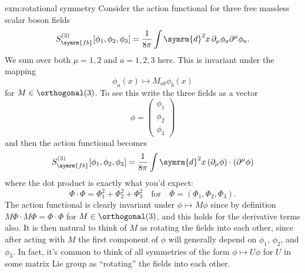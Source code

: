 \documentclass[fleqn]{NotesClass}
\renewcommand{\dl}[1]{\symrm{d}#1}
\newcommand{\freeboson}{\symrm{fb}}
\begin{document}
    \begin{exm}{}{exm:rotational symmetry}
        Consider the action functional for three free massless scalar boson fields
        \begin{equation}
            S_{\freeboson}^{(3)}[\phi_1, \phi_2, \phi_3] = \frac{1}{8\pi} \int \dl{^2x} \, \partial_\mu \phi_a \partial^\mu \phi_a.
        \end{equation}
        We sum over both \(\mu = 1, 2\) and \(a = 1, 2, 3\) here.
        This is invariant under the mapping
        \begin{equation}
            \phi_a(x) \mapsto M_{ab}\phi_b(x)
        \end{equation}
        for \(M \in \orthogonal(3)\).
        To see this write the three fields as a vector
        \begin{equation}
            \phi = 
            \begin{pmatrix}
                \phi_1\\ \phi_2\\ \phi_3
            \end{pmatrix}
        \end{equation}
        and then the action functional becomes
        \begin{equation}
            S_{\freeboson}^{(3)}[\phi_1, \phi_2, \phi_3] = \frac{1}{8\pi} \int \dl{^2x} \, (\partial_\mu \phi) \cdot (\partial^\mu \phi)
        \end{equation}
        where the dot product is exactly what you'd expect:
        \begin{equation}
            \Phi \cdot \Phi = \Phi_1^2 + \Phi_2^2 + \Phi_3^2 \quad \text{for} \quad \Phi = (\Phi_1, \Phi_2, \Phi_3).
        \end{equation}
        The action functional is clearly invariant under \(\phi \mapsto M\phi\) since by definition \(M\Phi \cdot M\Phi = \Phi \cdot \Phi\) for \(M \in \orthogonal(3)\), and this holds for the derivative terms also.
        It is then natural to think of \(M\) as rotating the fields into each other, since after acting with \(M\) the first component of \(\phi\) will generally depend on \(\phi_1\), \(\phi_2\), and \(\phi_3\).
        In fact, it's common to think of all symmetries of the form \(\phi \mapsto U \phi\) for \(U\) in some matrix Lie group as \enquote{rotating} the fields into each other.
        

\end{exm}
\end{document}
